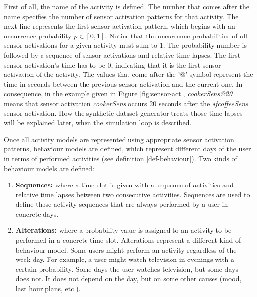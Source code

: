 First of all, the name of the activity is defined. The number that comes after the name specifies the number of sensor activation patterns for that activity. The next line represents the first sensor activation pattern, which begins with an occurrence probability $p \in [0, 1]$. Notice that the occurrence probabilities of all sensor activations for a given activity must sum to 1. The probability number is followed by a sequence of sensor activations and relative time lapses. The first sensor activation's time has to be 0, indicating that it is the first sensor activation of the activity. The values that come after the '@' symbol represent the time in seconds between the previous sensor activation and the current one. In consequence, in the example given in Figure \ref{fig:sensor-act}, \textit{cookerSens@20} means that sensor activation \textit{cookerSens} occurs 20 seconds after the \textit{afcoffeeSens} sensor activation. How the synthetic dataset generator treats those time lapses will be explained later, when the simulation loop is described.

Once all activity models are represented using appropriate sensor activation patterns, behaviour models are defined, which represent different days of the user in terms of performed activities (see definition \ref{def-behaviour}). Two kinds of behaviour models are defined: 

\begin{enumerate}
 \item \textbf{Sequences:} where a time slot is given with a sequence of activities and relative time lapses between two consecutive activities. Sequences are used to define those activity sequences that are always performed by a user in concrete days.
 \item \textbf{Alterations:} where a probability value is assigned to an activity to be performed in a concrete time slot. Alterations represent a different kind of behaviour model. Some users might perform an activity regardless of the week day. For example, a user might watch television in evenings with a certain probability. Some days the user watches television, but some days does not. It does not depend on the day, but on some other causes (mood, last hour plans, etc.).
\end{enumerate}

